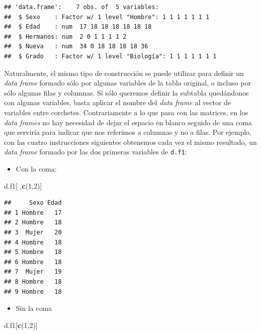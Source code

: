 \documentclass[]{book}
\newenvironment{Shaded}{\begin{snugshade}}{\end{snugshade}}
\newcommand{\DecValTok}[1]{\textcolor[rgb]{0.00,0.00,0.81}{#1}}
\newcommand{\KeywordTok}[1]{\textcolor[rgb]{0.13,0.29,0.53}{\textbf{#1}}}
\newcommand{\NormalTok}[1]{#1}
\providecommand{\tightlist}{%
  \setlength{\itemsep}{0pt}\setlength{\parskip}{0pt}}
\theoremstyle{definition}
\theoremstyle{definition}
\theoremstyle{definition}
\theoremstyle{remark}
\begin{document}
\begin{verbatim}
## 'data.frame':    7 obs. of  5 variables:
##  $ Sexo    : Factor w/ 1 level "Hombre": 1 1 1 1 1 1 1
##  $ Edad    : num  17 18 18 18 18 18 18
##  $ Hermanos: num  2 0 1 1 1 1 2
##  $ Nueva   : num  34 0 18 18 18 18 36
##  $ Grado   : Factor w/ 1 level "Biología": 1 1 1 1 1 1 1
\end{verbatim}

Naturalmente, el mismo tipo de construcción se puede utilizar para definir un \emph{data frame} formado sólo por algunas variables de la tabla original, o incluso por sólo algunas filas y columnas. Si sólo queremos definir la subtabla quedándonos con algunas variables, basta aplicar el nombre del \emph{data frame} al vector de variables entre corchetes. Contrariamente a lo que pasa con las matrices, en los \emph{data frames} no hay necesidad de dejar el espacio en blanco seguido de una coma que serviría para indicar que nos referimos a columnas y no a filas. Por ejemplo, con las cuatro instrucciones siguientes obtenemos cada vez el mismo resultado, un \emph{data frame} formado por las dos primeras variables de \texttt{d.f1}:

\begin{itemize}
\tightlist
\item
  Con la coma:
\end{itemize}

\begin{Shaded}
\begin{Highlighting}[]
\NormalTok{d.f1[ ,}\KeywordTok{c}\NormalTok{(}\DecValTok{1}\NormalTok{,}\DecValTok{2}\NormalTok{)]}
\end{Highlighting}
\end{Shaded}

\begin{verbatim}
##     Sexo Edad
## 1 Hombre   17
## 2 Hombre   18
## 3  Mujer   20
## 4 Hombre   18
## 5 Hombre   18
## 6 Hombre   18
## 7  Mujer   19
## 8 Hombre   18
## 9 Hombre   18
\end{verbatim}

\begin{itemize}
\tightlist
\item
  Sin la coma
\end{itemize}

\begin{Shaded}
\begin{Highlighting}[]
\NormalTok{d.f1[}\KeywordTok{c}\NormalTok{(}\DecValTok{1}\NormalTok{,}\DecValTok{2}\NormalTok{)]}
\end{Highlighting}
\end{Shaded}
\end{document}
